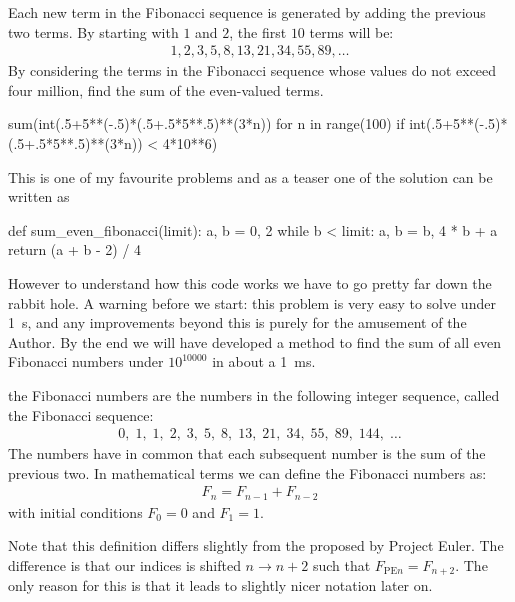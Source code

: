 \begin{ProjectEuler}{2}
	Each new term in the Fibonacci sequence is generated by adding the previous two terms. By starting with $1$ and $2$, the first $10$ terms will be:
	\begin{align*}
		1, 2, 3, 5, 8, 13, 21, 34, 55, 89, \ldots
	\end{align*}
	By considering the terms in the Fibonacci sequence whose values do not exceed four million, find the sum of the even-valued terms.
\end{ProjectEuler}
\begin{pythoncode}
	sum(int(.5+5**(-.5)*(.5+.5*5**.5)**(3*n)) for n in 
	range(100) if int(.5+5**(-.5)*(.5+.5*5**.5)**(3*n)) < 4*10**6)
\end{pythoncode}
This is one of my favourite problems and as a teaser one of the solution can be written as
%
\begin{pythoncode}
	def sum_even_fibonacci(limit):
    	a, b = 0, 2
    	while b < limit:
        	a, b = b, 4 * b + a
    	return (a + b - 2) / 4
\end{pythoncode}
%
However to understand how this code works we have to go pretty far down the rabbit hole. A warning before we start: this problem
is very easy to solve under \SI{1}{s}, and any improvements beyond this is purely for the amusement of the Author. By the end
we will have developed a method to find the sum of all even Fibonacci numbers under $10^{\num{10 000}}$ in about a \SI{1}{\ms}.
\begin{definition}
	the Fibonacci numbers are the numbers in the following integer sequence, called the Fibonacci sequence:
	\kortlinje
	\begin{align*}
		0,\;1,\;1,\;2,\;3,\;5,\;8,\;13,\;21,\;34,\;55,\;89,\;144,\; \ldots
	\end{align*}
	The numbers have in common that each subsequent number is the sum of the previous two. In mathematical terms we can define the Fibonacci numbers as:
	\begin{align}
	\label{eq: P01 F_n=F_n-1+F_n-2}
		F_{n} = F_{n-1} + F_{n-2}
	\end{align}
	with initial conditions $F_0 = 0$ and $F_1 = 1$.
\end{definition}
%
Note that this definition differs slightly from the proposed by Project Euler. The difference is that our indices
is shifted $n \to n+2$ such that $F_{\text{PE} n} = F_{n + 2}$. The  only reason for this is that it leads to slightly nicer notation later on.

